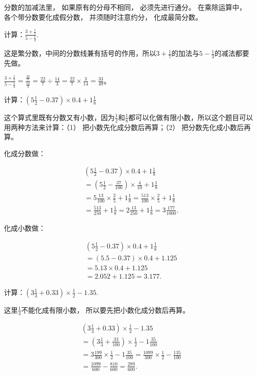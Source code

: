  分数的加减法里， 如果原有的分母不相同，
必须先进行通分。 在乘除运算中， 各个带分数要化成假分数，
并须随时注意约分， 化成最简分数。

 计算：\(\frac{3 + \frac{1}{7}}{5 - \frac{1}{3}}.\)

这是繁分数，中间的分数线兼有括号的作用，所以\(3 + \frac{1}{7}\)的加法与\(5 - \frac{1}{3}\)的减法都要先做。

\(\frac{3 + \frac{1}{7}}{5 - \frac{1}{3}} = \frac{\frac{22}{7}}{\frac{14}{3}} = \frac{22}{7} \div \frac{14}{3} = \frac{22}{7} \times \frac{3}{14} = \frac{33}{49}\)。

计算：\(\left(5\frac{1}{2} -0.37\right)\times 0.4 + 1\frac{1}{8}\)

这个算式里既有分数又有小数，因为\(\frac{1}{2}\)和\(\frac{1}{8}\)都可以化做有限小数，所以这个题目可以用两种方法来计算：（1）
把小数先化成分数后再算；（2） 把分数先化成小数后再算。

 化成分数做：

\[
\begin{aligned}
&\left(5 \frac{1}{2} - 0.37\right) \times 0.4 + 1 \frac{1}{8} \\
&= \left(5 \frac{1}{2} - \frac{37}{100}\right) \times \frac{4}{10} + 1 \frac{1}{8} \\
&= 5 \frac{13}{100} \times \frac{2}{5} + 1 \frac{1}{8} = \frac{513}{100} \times \frac{2}{5} + 1 \frac{1}{8} \\
&= \frac{513}{250} + 1 \frac{1}{8} = 2 \frac{13}{250} + 1 \frac{1}{8} = 3 \frac{177}{1000}.
\end{aligned}
\]

 化成小数做：

\[
\begin{aligned}
&\left(5 \frac{1}{2} - 0.37\right) \times 0.4 + 1 \frac{1}{8} \\
&= (5.5 - 0.37) \times 0.4 + 1.125 \\
&= 5.13 \times 0.4 + 1.125 \\
&= 2.052 + 1.125 = 3.177.
\end{aligned}
\]

计算：\(\left(3\frac{1}{3} +0.33\right)\times \frac{1}{2} -1.35.\)

 这里\(\frac{1}{3}\)不能化成有限小数，
所以要先把小数化成分数后再算。

\[
\begin{aligned}
&\left(3 \frac{1}{3} + 0.33\right) \times \frac{1}{2} - 1.35 \\
&= \left(3 \frac{1}{3} + \frac{33}{100}\right) \times \frac{1}{2} - 1 \frac{35}{100} \\
&= 3 \frac{199}{300} \times \frac{1}{2} - 1 \frac{35}{100} = \frac{1099}{300} \times \frac{1}{2} - \frac{135}{100} \\
&= \frac{1099}{600} - \frac{810}{600} = \frac{289}{600}.
\end{aligned}
\]

